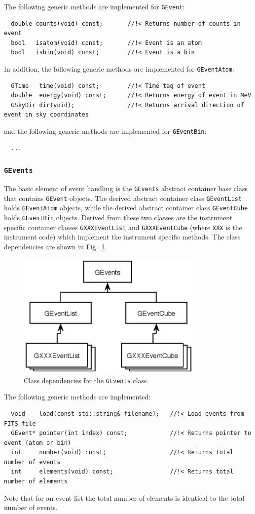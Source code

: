 \documentclass{article}[12pt,a4]
\begin{document}
The following generic methods are implemented for {\tt GEvent}:
\begin{verbatim}
  double counts(void) const;       //!< Returns number of counts in event
  bool   isatom(void) const;       //!< Event is an atom
  bool   isbin(void) const;        //!< Event is a bin
\end{verbatim}

In addition, the following generic methods are implemented for {\tt GEventAtom}:
\begin{verbatim}
  GTime   time(void) const;        //!< Time tag of event
  double  energy(void) const;      //!< Returns energy of event in MeV
  GSkyDir dir(void);               //!< Returns arrival direction of event in sky coordinates
\end{verbatim}
and the following generic methods are implemented for {\tt GEventBin}:
\begin{verbatim}
  ...
\end{verbatim}


\subsubsection{{\tt GEvents}}

The basic element of event handling is the {\tt GEvents} abstract container base class that
contains {\tt GEvent} objects.
The derived abstract container class {\tt GEventList} holds {\tt GEventAtom} objects, 
while the derived abstract container class {\tt GEventCube} holds {\tt GEventBin} objects.
Derived from these two classes are the instrument specific container classes
{\tt GXXXEventList} and {\tt GXXXEventCube} (where {\tt XXX} is the instrument code)
which implement the instrument specific methods.
The class dependencies are shown in Fig.~\ref{fig:GEvents}.
%
%
\begin{figure}[!h]
\centering
\includegraphics[width=9.1cm]{GEvents.eps}
\caption{Class dependencies for the {\tt GEvents} class.}
\label{fig:GEvents}
\end{figure}
%
%
The following generic methods are implemented:
\begin{verbatim}
  void    load(const std::string& filename);   //!< Load events from FITS file
  GEvent* pointer(int index) const;            //!< Returns pointer to event (atom or bin)
  int     number(void) const;                  //!< Returns total number of events
  int     elements(void) const;                //!< Returns total number of elements
\end{verbatim}
Note that for an event list the total number of elements is identical to the total
number of events.
\end{document}
